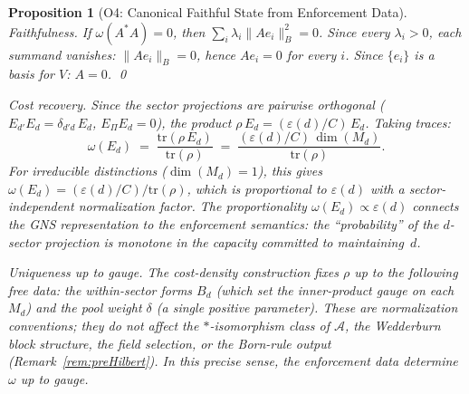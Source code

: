 \documentclass[11pt,a4paper]{article}
\newtheorem{proposition}[theorem]{Proposition}
\theoremstyle{definition}
\newcommand{\eps}{\varepsilon}
\newcommand{\tr}{\mathrm{tr}}
\begin{document}
\begin{proposition}[O4: Canonical Faithful State from Enforcement Data]
\noindent\textit{Faithfulness.}  If $\omega(A^*A) = 0$, then $\sum_i \lambda_i \|Ae_i\|_B^2 = 0$.  Since every $\lambda_i > 0$, each summand vanishes: $\|Ae_i\|_B = 0$, hence $Ae_i = 0$ for every $i$.  Since $\{e_i\}$ is a basis for $V$: $A = 0$.  \qed

\smallskip\noindent\textit{Cost recovery.}  Since the sector projections are pairwise orthogonal ($E_{d'} E_d = \delta_{d' d}\,E_d$, $E_\Pi E_d = 0$), the product $\rho\,E_d = (\eps(d)/C)\,E_d$.  Taking traces:
\[
\omega(E_d) \;=\; \frac{\tr(\rho\,E_d)}{\tr(\rho)} \;=\; \frac{(\eps(d)/C)\,\dim(M_d)}{\tr(\rho)}.
\]
For irreducible distinctions ($\dim(M_d) = 1$), this gives $\omega(E_d) = (\eps(d)/C)/\tr(\rho)$, which is proportional to $\eps(d)$ with a sector-independent normalization factor.  The proportionality $\omega(E_d) \propto \eps(d)$ connects the GNS representation to the enforcement semantics: the ``probability'' of the $d$-sector projection is monotone in the capacity committed to maintaining~$d$.

\smallskip\noindent\textit{Uniqueness up to gauge.}  The cost-density construction fixes $\rho$ up to the following free data: the within-sector forms $B_d$ (which set the inner-product gauge on each $M_d$) and the pool weight $\delta$ (a single positive parameter).  These are normalization conventions; they do not affect the $*$-isomorphism class of $\mathcal{A}$, the Wedderburn block structure, the field selection, or the Born-rule output (Remark~\ref{rem:preHilbert}).  In this precise sense, the enforcement data determine $\omega$ up to gauge.
\end{proposition}
\end{document}
